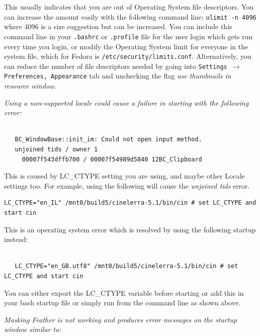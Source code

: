 This usually indicates that you are out of Operating System file descriptors.  You can increase the amount easily with the following command line:  \texttt{ulimit -n 4096}   where 4096 is a size suggestion but can be increased.  You can include this command line in your \texttt{.bashrc} or \texttt{.profile} file for the user login which gets run every time you login, or modify the Operating System limit for everyone in the system file, which for Fedora is \texttt{/etc/security/limits.conf}.  Alternatively, you can reduce the number of file descriptors needed by going into \texttt{Settings $\rightarrow$ Preferences, Appearance} tab and unchecking the flag \textit{use thumbnails in resource window}.

\bigskip

\textit{Using a non-supported locale could cause a failure in starting \CGG{} with the following error:}

\begin{lstlisting}[numbers=none,xleftmargin=10mm]

   BC_WindowBase::init_im: Could not open input method.
   unjoined tids / owner 1
     00007f543dffb700 / 00007f54989d5840 12BC_Clipboard

\end{lstlisting}

This is caused by LC\_CTYPE setting you are using, and maybe other Locale settings too. 
For example, using the following will cause the \textit{unjoined tids} error.

\begin{lstlisting}[numbers=none,xleftmargin=10mm]
   LC_CTYPE="en_IL" /mnt0/build5/cinelerra-5.1/bin/cin # set LC_CTYPE and start cin 
\end{lstlisting}

This is an operating system error which is resolved by using the following startup instead:

\begin{lstlisting}[numbers=none,xleftmargin=10mm]

   LC_CTYPE="en_GB.utf8" /mnt0/build5/cinelerra-5.1/bin/cin # set LC_CTYPE and start cin 
\end{lstlisting}

You can either export the LC\_CTYPE variable before starting \CGG{} or
add this in your bash startup file or simply run from the command line as shown above.

\bigskip
\textit{Masking Feather is not working and produces error messages on the startup window similar to:}

